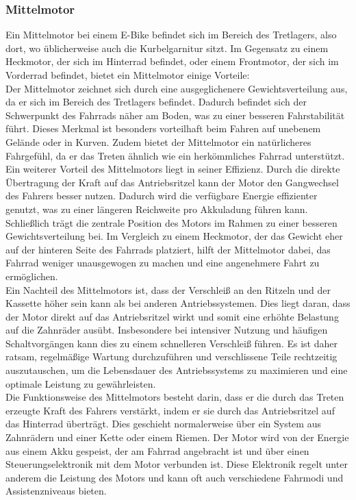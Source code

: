 \subsubsection*{Mittelmotor}
Ein Mittelmotor bei einem E-Bike befindet sich im Bereich des Tretlagers, also dort, wo üblicherweise auch die Kurbelgarnitur sitzt. Im Gegensatz zu einem Heckmotor, der sich im Hinterrad befindet, oder einem Frontmotor, der sich im Vorderrad befindet, bietet ein Mittelmotor einige Vorteile:\\

Der Mittelmotor zeichnet sich durch eine ausgeglichenere Gewichtsverteilung aus, da er sich im Bereich des Tretlagers befindet. Dadurch befindet sich der Schwerpunkt des Fahrrads näher am Boden, was zu einer besseren Fahrstabilität führt. Dieses Merkmal ist besonders vorteilhaft beim Fahren auf unebenem Gelände oder in Kurven. Zudem bietet der Mittelmotor ein natürlicheres Fahrgefühl, da er das Treten ähnlich wie ein herkömmliches Fahrrad unterstützt.\\

Ein weiterer Vorteil des Mittelmotors liegt in seiner Effizienz. Durch die direkte Übertragung der Kraft auf das Antriebsritzel kann der Motor den Gangwechsel des Fahrers besser nutzen. Dadurch wird die verfügbare Energie effizienter genutzt, was zu einer längeren Reichweite pro Akkuladung führen kann. Schließlich trägt die zentrale Position des Motors im Rahmen zu einer besseren Gewichtsverteilung bei. Im Vergleich zu einem Heckmotor, der das Gewicht eher auf der hinteren Seite des Fahrrads platziert, hilft der Mittelmotor dabei, das Fahrrad weniger unausgewogen zu machen und eine angenehmere Fahrt zu ermöglichen.\\

Ein Nachteil des Mittelmotors ist, dass der Verschleiß an den Ritzeln und der Kassette höher sein kann als bei anderen Antriebssystemen. Dies liegt daran, dass der Motor direkt auf das Antriebsritzel wirkt und somit eine erhöhte Belastung auf die Zahnräder ausübt. Insbesondere bei intensiver Nutzung und häufigen Schaltvorgängen kann dies zu einem schnelleren Verschleiß führen. Es ist daher ratsam, regelmäßige Wartung durchzuführen und verschlissene Teile rechtzeitig auszutauschen, um die Lebensdauer des Antriebssystems zu maximieren und eine optimale Leistung zu gewährleisten.\\

Die Funktionsweise des Mittelmotors besteht darin, dass er die durch das Treten erzeugte Kraft des Fahrers verstärkt, indem er sie durch das Antriebsritzel auf das Hinterrad überträgt. Dies geschieht normalerweise über ein System aus Zahnrädern und einer Kette oder einem Riemen. Der Motor wird von der Energie aus einem Akku gespeist, der am Fahrrad angebracht ist und über einen Steuerungselektronik mit dem Motor verbunden ist. Diese Elektronik regelt unter anderem die Leistung des Motors und kann oft auch verschiedene Fahrmodi und Assistenzniveaus bieten.

